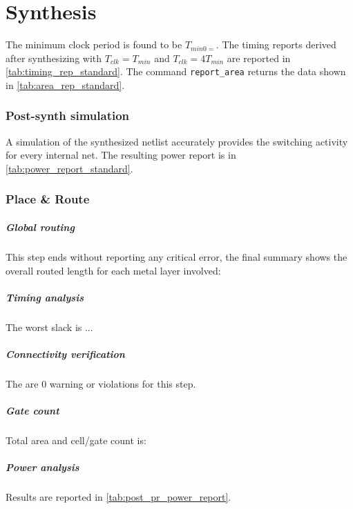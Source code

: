 \chapter{Synthesis}
The minimum clock period is found to be $T_{min0=}$. The timing reports derived after synthesizing with $T_{clk}=T_{min}$ and $T_{clk}=4T_{min}$ are reported in \autoref{tab:timing_rep_standard}.
The command \texttt{report\_area} returns the data shown in \autoref{tab:area_rep_standard}.
\subsection{Post-synth simulation}
A simulation of the synthesized netlist accurately provides the switching activity for every internal net. The resulting power report is in \autoref{tab:power_report_standard}.
\subsection{Place \& Route}
\paragraph{Global routing} This step ends without reporting any critical error, the final summary shows the overall routed length for each metal layer involved:


\paragraph{Timing analysis} The worst slack is ...


\paragraph{Connectivity verification} The are 0 warning or violations for this step.


\paragraph{Gate count} Total area and cell/gate count is:


\paragraph{Power analysis} Results are reported in \autoref{tab:post_pr_power_report}.